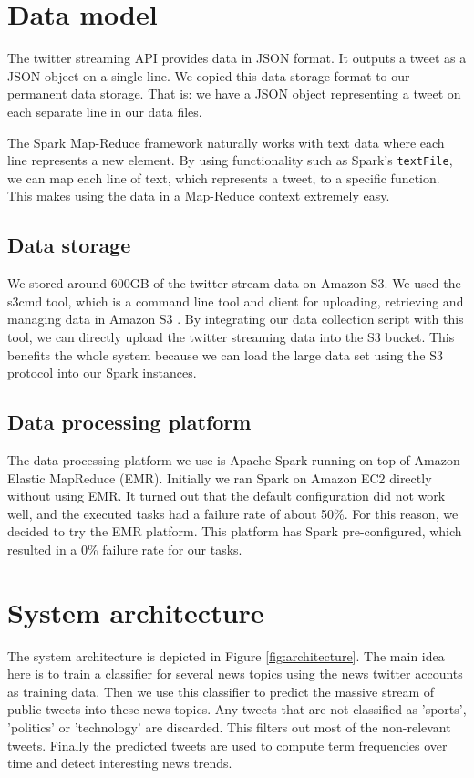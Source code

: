 \documentclass{llncs}
\begin{document}
\section{Data model}
The twitter streaming API provides data in JSON format. It outputs a tweet as a JSON object on a single line. We copied this data storage format to our permanent data storage. That is: we have a JSON object representing a tweet on each separate line in our data files.

The Spark Map-Reduce framework naturally works with text data where each line represents a new element. By using functionality such as Spark's \texttt{textFile}, we can map each line of text, which represents a tweet, to a specific function. This makes using the data in a Map-Reduce context extremely easy.

\subsection{Data storage}
We stored around 600GB of the twitter stream data on Amazon S3. We used the s3cmd tool, which is a command line tool and client for uploading, retrieving and managing data in Amazon S3 \cite{s3cmd}. By integrating our data collection script with this tool, we can directly upload the twitter streaming data into the S3 bucket. This benefits the whole system because we can load the large data set using the S3 protocol into our Spark instances.

\subsection{Data processing platform}
The data processing platform we use is Apache Spark running on top of Amazon Elastic MapReduce (EMR). Initially we ran Spark on Amazon EC2 directly without using EMR. It turned out that the default configuration did not work well, and the executed tasks had a failure rate of about 50\%. For this reason, we decided to try the EMR platform. This platform has Spark pre-configured, which resulted in a 0\% failure rate for our tasks.

\section{System architecture}
The system architecture is depicted in Figure \ref{fig:architecture}. The main idea here is to train a classifier for several news topics using the news twitter accounts as training data. Then we use this classifier to predict the massive stream of public tweets into these news topics. Any tweets that are not classified as 'sports', 'politics' or 'technology' are discarded. This filters out most of the non-relevant tweets. Finally the predicted tweets are used to compute term frequencies over time and detect interesting news trends.
\end{document}
